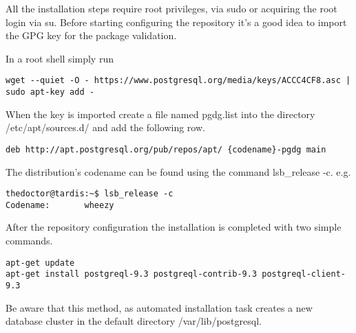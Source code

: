 All the installation steps require root privileges, via sudo or acquiring the root login via su.
Before starting configuring the repository it's a good idea to import the GPG key for the
package validation.

In a root shell simply run
\begin{verbatim}
wget --quiet -O - https://www.postgresql.org/media/keys/ACCC4CF8.asc | sudo apt-key add -
\end{verbatim}
When the key is imported create a file named pgdg.list into the directory /etc/apt/sources.d/ and
add the following row.

\begin{verbatim}
deb http://apt.postgresql.org/pub/repos/apt/ {codename}-pgdg main
\end{verbatim}


The distribution's codename can be found using the command lsb\_release -c. 
e.g.
\begin{verbatim}
thedoctor@tardis:~$ lsb_release -c
Codename:       wheezy
\end{verbatim}

After the repository configuration the installation is completed with two simple commands.

\begin{verbatim}
apt-get update
apt-get install postgreql-9.3 postgreql-contrib-9.3 postgreql-client-9.3 
\end{verbatim}

Be aware that this method, as automated installation task creates a new database cluster in
the default directory /var/lib/postgresql.

